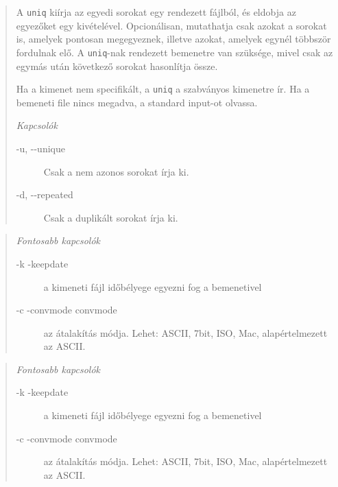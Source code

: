 \noindent{}
\begin{quotation}

       A \verb.uniq. kiírja az egyedi sorokat egy rendezett  fájlból,  és eldobja  az  egyezőket  egy  kivételével.  
      Opcionálisan,  mutathatja csak azokat a sorokat is, amelyek pontosan megegyeznek, illetve azokat, amelyek egynél többször fordulnak elő. A \verb.uniq.-nak rendezett bemenetre van  szüksége,  mivel
       csak az egymás után következő sorokat hasonlítja össze.

       Ha a kimenet nem specifikált, a \verb.uniq. a szabványos kimenetre ír. Ha a bemeneti file nincs megadva, 
	a standard input-ot  olvassa.
    \bigskip
    
    \emph{Kapcsolók}
    \begin{description}
     \item[-u, -{}-unique]
              Csak a nem azonos sorokat írja ki.

      \item[-d, -{}-repeated]
              Csak a duplikált sorokat írja ki.
    \end{description}
\end{quotation}


\noindent{}

\begin{quotation}
    \emph{Fontosabb kapcsolók}
	\begin{description}
		\item[-k -\-keepdate] a kimeneti fájl időbélyege egyezni fog a bemenetivel
		\item[-c -\-convmode convmode] az átalakítás módja. Lehet: ASCII, 7bit, ISO, Mac, alapértelmezett az ASCII.
	\end{description}
\end{quotation}


\noindent{}


\begin{quotation}
    \emph{Fontosabb kapcsolók}
	\begin{description}
		\item[-k -\-keepdate] a kimeneti fájl időbélyege egyezni fog a bemenetivel
		\item[-c -\-convmode convmode] az átalakítás módja. Lehet: ASCII, 7bit, ISO, Mac, alapértelmezett az ASCII.
	\end{description}
\end{quotation}


